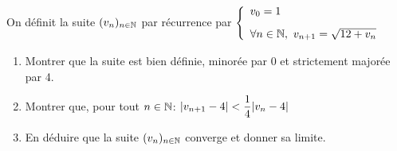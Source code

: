 \documentclass[a4paper, 11pt,reqno]{article}
\begin{document}
\begin{exercice}  \;
	On d\'efinit la suite $(v_n)_{n\in \mathbb{N}}$ par r\'ecurrence par $\left \lbrace\begin{array}{l}
			v_0=1\vsec \\
			\forall n\in\N,\ v_{n+1}=\sqrt{12+v_n}
		\end{array}\right.$
	\begin{enumerate}
		\item Montrer que la suite est bien d\'efinie, minor\'ee par 0 et strictement major\'ee par 4.
		\item Montrer que, pour tout $n\in\mathbb{N}$: $|v_{n+1}-4|<\displaystyle\frac{1}{4}|v_n-4|$
		\item En d\'eduire que la suite $(v_n)_{n\in \mathbb{N}}$ converge et donner sa limite.
	\end{enumerate}
\end{exercice}
\end{document}
